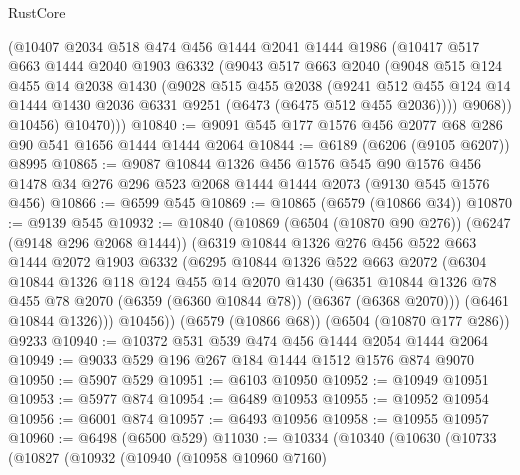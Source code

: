 \begin{lexlean}{RustCore}
\begin{coremodule}
        (@10407
          @2034
          @518
          @474
          @456
          @1444
          @2041
          @1444
          @1986
          (@10417
            @517
            @663
            @1444
            @2040
            @1903
            @6332
            (@9043
              @517
              @663
              @2040
              (@9048
                @515
                @124
                @455
                @14
                @2038
                @1430
                (@9028
                  @515
                  @455
                  @2038
                  (@9241
                    @512
                    @455
                    @124
                    @14
                    @1444
                    @1430
                    @2036
                    @6331
                    @9251
                    (@6473 (@6475 @512 @455 @2036))))
                @9068))
            @10456)
          @10470)))
@10840 := @9091 @545 @177 @1576 @456 @2077 @68 @286 @90 @541 @1656 @1444 @1444 @2064
@10844 := @6189 (@6206 (@9105 @6207)) @8995
@10865 := @9087
    @10844
    @1326
    @456
    @1576
    @545
    @90
    @1576
    @456
    @1478
    @34
    @276
    @296
    @523
    @2068
    @1444
    @1444
    @2073
    (@9130 @545 @1576 @456)
@10866 := @6599 @545
@10869 := @10865 (@6579 (@10866 @34))
@10870 := @9139 @545
@10932 := @10840
    (@10869
      (@6504 (@10870 @90 @276))
      (@6247 (@9148 @296 @2068 @1444))
      (@6319
        @10844
        @1326
        @276
        @456
        @522
        @663
        @1444
        @2072
        @1903
        @6332
        (@6295
          @10844
          @1326
          @522
          @663
          @2072
          (@6304
            @10844
            @1326
            @118
            @124
            @455
            @14
            @2070
            @1430
            (@6351 @10844 @1326 @78 @455 @78 @2070 (@6359 (@6360 @10844 @78)) (@6367 (@6368 @2070)))
            (@6461 @10844 @1326)))
        @10456))
    (@6579 (@10866 @68))
    (@6504 (@10870 @177 @286))
    @9233
@10940 := @10372 @531 @539 @474 @456 @1444 @2054 @1444 @2064
@10949 := @9033 @529 @196 @267 @184 @1444 @1512 @1576 @874 @9070
@10950 := @5907 @529
@10951 := @6103 @10950
@10952 := @10949 @10951
@10953 := @5977 @874
@10954 := @6489 @10953
@10955 := @10952 @10954
@10956 := @6001 @874
@10957 := @6493 @10956
@10958 := @10955 @10957
@10960 := @6498 (@6500 @529)
@11030 := @10334
    (@10340
      (@10630
        (@10733
          (@10827
            (@10932
              (@10940
                (@10958 @10960 @7160)

\end{coremodule}
\end{lexlean}
